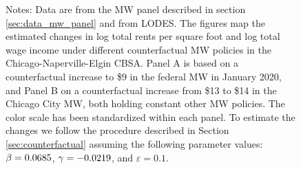 \begin{figure}[h!]
    \begin{minipage}{.95\textwidth} \footnotesize
        \vspace{2.5mm}
        Notes: 
        Data are from the MW panel described in section \ref{sec:data_mw_panel} 
        and from LODES.
        The figures map the estimated changes in log total rents per square foot
        and log total wage income under different counterfactual MW policies 
        in the Chicago-Naperville-Elgin CBSA.
        Panel A is based on a counterfactual increase to \$9 in the 
        federal MW in January 2020, and Panel B on a counterfactual increase 
        from \$13 to \$14 in the Chicago City MW, both holding constant other 
        MW policies.
        The color scale has been standardized within each panel.
        To estimate the changes we follow the procedure described in Section 
        \ref{sec:counterfactual} assuming the following parameter values: 
        $\beta = 0.0685$, $\gamma = -0.0219$, and $\varepsilon = 0.1$.
    \end{minipage}
\end{figure}
